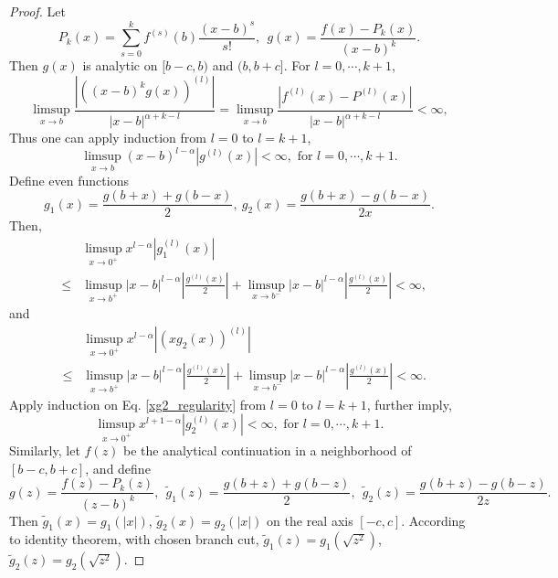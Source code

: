 \documentclass[10pt,a4paper]{amsart}
\begin{document}
\begin{proof} 
Let \begin{equation}
    P_k(x) = \sum_{s=0}^k f^{(s)}(b)\frac{(x-b)^s}{s!}, \ \ g(x) = \frac{f(x)-P_k(x)}{(x-b)^k}.
\end{equation} 
Then $g(x)$ is analytic on $[b-c,b)$ and $(b,b+c]$. For $l =0,\cdots,k+1$,
\begin{equation}
    \limsup_{x\to b} \frac{|\left((x-b)^k g(x)\right)^{(l)}|}{|x-b|^{\alpha+k-l}}=\limsup_{x\to b} \frac{|f^{(l)}(x)-P^{(l)}(x)|}{|x-b|^{\alpha+k-l}} < \infty,
\end{equation}
Thus one can apply induction from $l=0$ to $l =k+1$,
\begin{equation}
    \limsup_{x\to b} (x-b)^{l-\alpha} |g^{(l)}(x)| < \infty, \text{ for } l =0,\cdots,k+1.
\end{equation}
Define even functions
\begin{equation}
    g_1(x) = \frac{g(b+x) + g(b-x)}{2}, \ g_2(x) = \frac{g(b+x) - g(b-x)}{2x}.
\end{equation}
Then,
\begin{eqnarray}
    &&\limsup_{x\to 0^+} x^{l-\alpha} |g^{(l)}_1(x)| \nonumber\\
    &\leq& \limsup_{x\to b^+}   |x-b|^{l-\alpha}\left|\frac{g^{(l)}(x)}{2}\right| + \limsup_{x\to b^-}   |x-b|^{l-\alpha}\left|\frac{g^{(l)}(x)}{2}\right| < \infty,
\end{eqnarray}
and
\begin{eqnarray}
    &&\limsup_{x\to 0^+} x^{l-\alpha} |(xg_2(x))^{(l)}| \nonumber\\
    &\leq& \limsup_{x\to b^+}   |x-b|^{l-\alpha}\left|\frac{g^{(l)}(x)}{2}\right| + \limsup_{x\to b^-}   |x-b|^{l-\alpha}\left|\frac{g^{(l)}(x)}{2}\right| < \infty. \label{xg2_regularity}
\end{eqnarray}
Apply induction on Eq. \eqref{xg2_regularity} from $l=0$ to $l =k+1$, further imply,
\begin{equation}
    \limsup_{x\to 0^+} x^{l+1-\alpha} |g_2^{(l)}(x)| < \infty, \text{ for } l = 0, \cdots, k+1.
\end{equation}
Similarly, let $f(z)$ be the analytical continuation in a neighborhood of $[b-c,b+c]$, and define 
\begin{equation}
    g(z) = \frac{f(z)-P_k(z)}{(z-b)^k}, \ \ \tilde{g}_1(z) = \frac{g(b+z) + g(b-z)}{2},\ \ \tilde{g}_2(z) = \frac{g(b+z) - g(b-z)}{2z}. \nonumber
\end{equation}
Then $\tilde{g}_1(x) = g_1(|x|)$, $\tilde{g}_2(x) = g_2(|x|)$ on the real axis $[-c,c]$. According to identity theorem, with chosen branch cut, $\tilde{g}_1(z) = g_1(\sqrt{z^2})$, $\tilde{g}_2(z) = g_2(\sqrt{z^2})$.
\end{proof}
\end{document}
